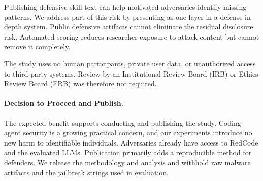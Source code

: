 Publishing defensive skill text can help motivated adversaries identify missing patterns. We address part of this risk by presenting \sysname as one layer in a defense-in-depth system. Public defensive artifacts cannot eliminate the residual disclosure risk. Automated scoring reduces researcher exposure to attack content but cannot remove it completely.

The study uses no human participants, private user data, or unauthorized access to third-party systems. Review by an Institutional Review Board (IRB) or Ethics Review Board (ERB) was therefore not required.

\paragraph{Decision to Proceed and Publish.}
The expected benefit supports conducting and publishing the study. Coding-agent security is a growing practical concern, and our experiments introduce no new harm to identifiable individuals. Adversaries already have access to RedCode and the evaluated LLMs. Publication primarily adds a reproducible method for defenders. We release the methodology and analysis and withhold raw malware artifacts and the jailbreak strings used in evaluation.
